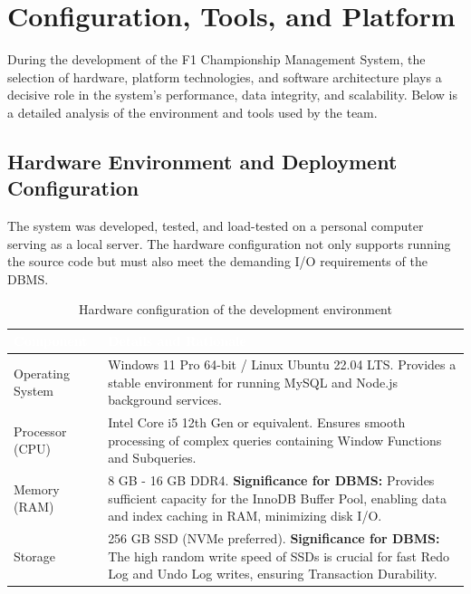 \documentclass[12pt, a4paper]{report}
\begin{document}
\chapter{Configuration, Tools, and Platform}

During the development of the F1 Championship Management System, the selection of hardware, platform technologies, and software architecture plays a decisive role in the system's performance, data integrity, and scalability. Below is a detailed analysis of the environment and tools used by the team.

\section{Hardware Environment and Deployment Configuration}

The system was developed, tested, and load-tested on a personal computer serving as a local server. The hardware configuration not only supports running the source code but must also meet the demanding I/O requirements of the DBMS.

\begin{table}[h]
\centering
\caption{Hardware configuration of the development environment}
\begin{tabularx}{\textwidth}{L{4cm} L{11.2cm}}
\toprule
{}
\textcolor{white}{\textbf{Component}} & \textcolor{white}{\textbf{Details and Rationale}} \\
\midrule
Operating System & Windows 11 Pro 64-bit / Linux Ubuntu 22.04 LTS. Provides a stable environment for running MySQL and Node.js background services. \\
Processor (CPU) & Intel Core i5 12th Gen or equivalent. Ensures smooth processing of complex queries containing Window Functions and Subqueries. \\
Memory (RAM) & 8 GB - 16 GB DDR4. \textbf{Significance for DBMS:} Provides sufficient capacity for the InnoDB Buffer Pool, enabling data and index caching in RAM, minimizing disk I/O. \\
Storage & 256 GB SSD (NVMe preferred). \textbf{Significance for DBMS:} The high random write speed of SSDs is crucial for fast Redo Log and Undo Log writes, ensuring Transaction Durability. \\
\bottomrule
\end{tabularx}
\end{table}
\end{document}
